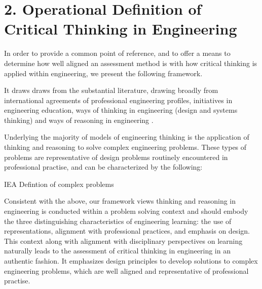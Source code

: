 \section{2. Operational Definition of Critical Thinking in Engineering}

In order to provide a common point of reference, and to offer a means to determine how well aligned an assessment method is with how critical thinking is applied within engineering, we present the following framework.  

It draws draws from the substantial literature, drawing broadly from international agreements of professional engineering profiles\cite{internationalengineeringalliance}, initiatives in engineering education\cite{crawley2011cdio}, ways of thinking in engineering (design and systems thinking) \cite{Dorst:2010tc, Dym:2005gy, Frank:2001ut}and ways of reasoning in engineering \cite{Stein:2011hr, Paul:2006kv}. 

Underlying the majority of models of engineering thinking is the application of thinking and reasoning to solve complex engineering problems. These types of problems are representative of design problems routinely encountered in professional practise, and can be characterized by the following: 

{IEA Defintion of complex problems}

Consistent with the above, our framework views thinking and reasoning in engineering is conducted within a problem solving context and should embody the three distinguishing characteristics of engineering learning: the use of representations, alignment with professional practices, and emphasis on design\cite{Johri:2014tk}. This context along with alignment with disciplinary perspectives on learning naturally leads to the assessment of critical thinking in engineering in an authentic fashion.  It emphasizes design principles to develop solutions to  complex engineering problems, which are well aligned and representative of professional practise.

